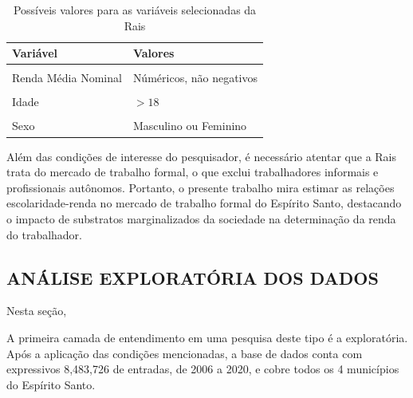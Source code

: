 \documentclass[
  12pt,
  letterpaper,
  DIV=11,
  numbers=noendperiod]{scrartcl}
\begin{document}
\begin{table}
\caption{Possíveis valores para as variáveis selecionadas da Rais}\tabularnewline

\centering\begingroup\fontsize{10}{12}\selectfont

\begin{tabular}[t]{l>{\raggedright\arraybackslash}p{30em}}
\toprule
Variável & Valores\\
\midrule
\cellcolor{gray!6}{Sigla UF} & \cellcolor{gray!6}{ES}\\
Renda Média Nominal & Núméricos, não negativos\\
\cellcolor{gray!6}{Ciclo de Escolaridade} & \cellcolor{gray!6}{Analfabeto, Ensino Fundamental (I/II, completo/incompleto),  Ensino Médio (completo/incompleto), Ensino Superior (completo/incompleto), Mestrado ou Doutorado}\\
Idade & $>18$\\
\cellcolor{gray!6}{Raça/Cor} & \cellcolor{gray!6}{Branco, Preto, Pardo, Indígena ou Amarelo}\\
\addlinespace
Sexo & Masculino ou Feminino\\
\bottomrule
\end{tabular}
\endgroup{}
\end{table}

Além das condições de interesse do pesquisador, é necessário atentar que
a Rais trata do mercado de trabalho formal, o que exclui trabalhadores
informais e profissionais autônomos. Portanto, o presente trabalho mira
estimar as relações escolaridade-renda no mercado de trabalho formal do
Espírito Santo, destacando o impacto de substratos marginalizados da
sociedade na determinação da renda do trabalhador.

\hypertarget{anuxe1lise-exploratuxf3ria-dos-dados}{%
\subsection{ANÁLISE EXPLORATÓRIA DOS
DADOS}\label{anuxe1lise-exploratuxf3ria-dos-dados}}

Nesta seção,

A primeira camada de entendimento em uma pesquisa deste tipo é a
exploratória. Após a aplicação das condições mencionadas, a base de
dados conta com expressivos 8,483,726 de entradas, de 2006 a 2020, e
cobre todos os 4 municípios do Espírito Santo.
\end{document}
